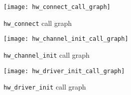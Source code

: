 \documentclass[12pt]{article}
\begin{document}
\begin{figure}
  \texttt{[image: hw\_connect\_call\_graph]}
  \caption{\texttt{hw\_connect} call graph}
  \label{fig:hw-connect-call}
\end{figure}

\begin{figure}
  \texttt{[image: hw\_channel\_init\_call\_graph]}
  \caption{\texttt{hw\_channel\_init} call graph}
  \label{fig:hw-channel-init-call}
\end{figure}

\begin{figure}
  \texttt{[image: hw\_driver\_init\_call\_graph]}
  \caption{\texttt{hw\_driver\_init} call graph}
  \label{fig:hw-driver-init-call}
\end{figure}
\end{document}
